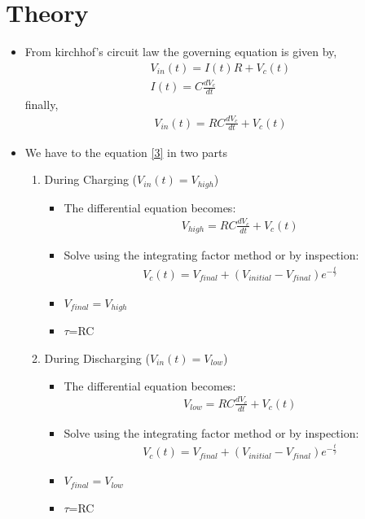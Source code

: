 \documentclass[a4paper,12pt]{article}
\begin{document}
\section*{Theory}
     \begin{itemize}
            \item From kirchhof's circuit law the governing equation is given by,
            \begin{align}
                V_{in}(t)=I(t)R+V_c(t)\\
                I(t)=C\frac{dV_c}{dt}
            \end{align}
            finally,
            \begin{align}
                V_{in}(t)=RC\frac{dV_c}{dt}+V_c(t)\label{3}
            \end{align}
        \item We have to the equation \eqref{3} in two parts
        \begin{enumerate}
            \item During Charging ($V_{in}(t)=V_{high}$)\\
                    \begin{itemize}
                    \item The differential equation becomes:
                    \begin{align}
                         V_{high}=RC\frac{dV_c}{dt}+V_c(t)
                    \end{align}
                    \item Solve using the integrating factor method or by inspection:
                    \begin{align}
                        V_c(t)=V_{final}+(V_{initial}-V_{final})e^{-\frac{t}{\tau}}
                    \end{align}
                    \item $V_{final}=V_{high}$
                    \item $\tau$=RC
                    \end{itemize}
            \item During Discharging ($V_{in}(t)=V_{low}$)\\
                    \begin{itemize}
                    \item The differential equation becomes:
                    \begin{align}
                         V_{low}=RC\frac{dV_c}{dt}+V_c(t)
                    \end{align}
                    \item Solve using the integrating factor method or by inspection:
                    \begin{align}
                        V_c(t)=V_{final}+(V_{initial}-V_{final})e^{-\frac{t}{\tau}}
                    \end{align}
                    \item $V_{final}=V_{low}$
                    \item $\tau$=RC
                    \end{itemize}
        \end{enumerate}
    \end{itemize}
    \newpage
\end{document}
